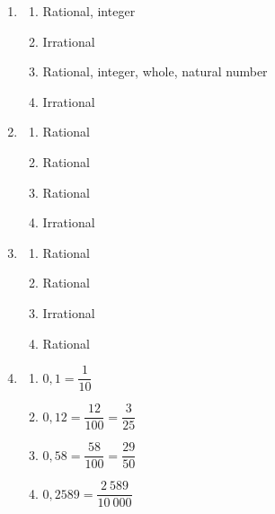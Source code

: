 \begin{solutions}{}{
  \begin{enumerate}[itemsep=5pt, label=\textbf{\arabic*}. ] 
  \item %
    \begin{multicols}{2}
      \begin{enumerate}[noitemsep, label=\textbf{(\alph*)} ] 
      \item Rational, integer%
      \item Irrational%
      \item Rational, integer, whole, natural number%
      \item Irrational %
      \end{enumerate}
    \end{multicols}

  \item %
    \begin{multicols}{2}
      \begin{enumerate}[itemsep=0pt, label=\textbf{(\alph*)} ] 
      \item Rational
      \item Rational
      \item Rational
      \item Irrational 
      \end{enumerate}
    \end{multicols}

  \item %
    \begin{multicols}{2}
      \begin{enumerate}[itemsep=0pt, label=\textbf{(\alph*)} ] 
      \item Rational
      \item Rational
      \item Irrational
      \item Rational
      \end{enumerate}
    \end{multicols}

  \item %
    \begin{multicols}{2}
      \begin{enumerate}[itemsep=6pt, label=\textbf{(\alph*)} ] 
      \item $0,1 = \dfrac{1}{10}$
      \item $0,12 = \dfrac{12}{100} = \dfrac{3}{25}$
      \item $0,58 = \dfrac{58}{100} = \dfrac{29}{50}$
      \item $0,2589 = \dfrac{2~589}{10~000}$
      \end{enumerate}
    \end{multicols}


\end{enumerate}}
\end{solutions}
